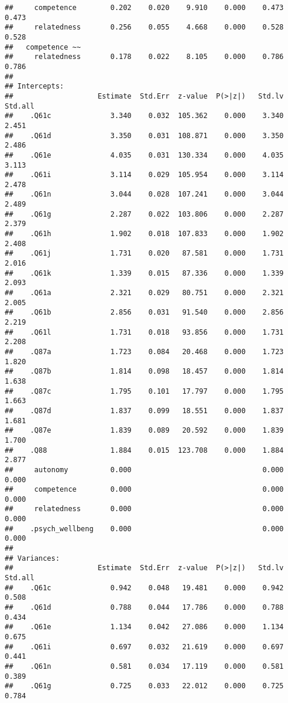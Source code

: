 \documentclass[
]{article}
\begin{document}
\begin{verbatim}
##     competence        0.202    0.020    9.910    0.000    0.473    0.473
##     relatedness       0.256    0.055    4.668    0.000    0.528    0.528
##   competence ~~                                                         
##     relatedness       0.178    0.022    8.105    0.000    0.786    0.786
## 
## Intercepts:
##                    Estimate  Std.Err  z-value  P(>|z|)   Std.lv  Std.all
##    .Q61c              3.340    0.032  105.362    0.000    3.340    2.451
##    .Q61d              3.350    0.031  108.871    0.000    3.350    2.486
##    .Q61e              4.035    0.031  130.334    0.000    4.035    3.113
##    .Q61i              3.114    0.029  105.954    0.000    3.114    2.478
##    .Q61n              3.044    0.028  107.241    0.000    3.044    2.489
##    .Q61g              2.287    0.022  103.806    0.000    2.287    2.379
##    .Q61h              1.902    0.018  107.833    0.000    1.902    2.408
##    .Q61j              1.731    0.020   87.581    0.000    1.731    2.016
##    .Q61k              1.339    0.015   87.336    0.000    1.339    2.093
##    .Q61a              2.321    0.029   80.751    0.000    2.321    2.005
##    .Q61b              2.856    0.031   91.540    0.000    2.856    2.219
##    .Q61l              1.731    0.018   93.856    0.000    1.731    2.208
##    .Q87a              1.723    0.084   20.468    0.000    1.723    1.820
##    .Q87b              1.814    0.098   18.457    0.000    1.814    1.638
##    .Q87c              1.795    0.101   17.797    0.000    1.795    1.663
##    .Q87d              1.837    0.099   18.551    0.000    1.837    1.681
##    .Q87e              1.839    0.089   20.592    0.000    1.839    1.700
##    .Q88               1.884    0.015  123.708    0.000    1.884    2.877
##     autonomy          0.000                               0.000    0.000
##     competence        0.000                               0.000    0.000
##     relatedness       0.000                               0.000    0.000
##    .psych_wellbeng    0.000                               0.000    0.000
## 
## Variances:
##                    Estimate  Std.Err  z-value  P(>|z|)   Std.lv  Std.all
##    .Q61c              0.942    0.048   19.481    0.000    0.942    0.508
##    .Q61d              0.788    0.044   17.786    0.000    0.788    0.434
##    .Q61e              1.134    0.042   27.086    0.000    1.134    0.675
##    .Q61i              0.697    0.032   21.619    0.000    0.697    0.441
##    .Q61n              0.581    0.034   17.119    0.000    0.581    0.389
##    .Q61g              0.725    0.033   22.012    0.000    0.725    0.784

\end{verbatim}
\end{document}
